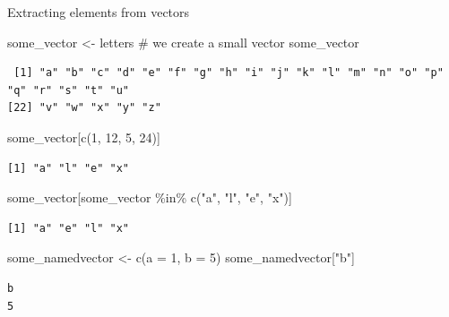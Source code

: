 \documentclass[
  ignorenonframetext,
  aspectratio=169,
]{beamer}
\newenvironment{Shaded}{\begin{snugshade}}{\end{snugshade}}
\newcommand{\AttributeTok}[1]{\textcolor[rgb]{0.40,0.45,0.13}{#1}}
\newcommand{\CommentTok}[1]{\textcolor[rgb]{0.37,0.37,0.37}{#1}}
\newcommand{\DecValTok}[1]{\textcolor[rgb]{0.68,0.00,0.00}{#1}}
\newcommand{\FunctionTok}[1]{\textcolor[rgb]{0.28,0.35,0.67}{#1}}
\newcommand{\NormalTok}[1]{\textcolor[rgb]{0.00,0.23,0.31}{#1}}
\newcommand{\OtherTok}[1]{\textcolor[rgb]{0.00,0.23,0.31}{#1}}
\newcommand{\SpecialCharTok}[1]{\textcolor[rgb]{0.37,0.37,0.37}{#1}}
\newcommand{\StringTok}[1]{\textcolor[rgb]{0.13,0.47,0.30}{#1}}
\begin{document}
\begin{frame}[fragile]{Extracting elements from vectors}
\protect{}\label{extracting-elements-from-vectors}
\footnotesize

\begin{Shaded}
\begin{Highlighting}[]
\NormalTok{some\_vector }\OtherTok{\textless{}{-}}\NormalTok{ letters }\CommentTok{\# we create a small vector}
\NormalTok{some\_vector}
\end{Highlighting}
\end{Shaded}

\begin{verbatim}
 [1] "a" "b" "c" "d" "e" "f" "g" "h" "i" "j" "k" "l" "m" "n" "o" "p" "q" "r" "s" "t" "u"
[22] "v" "w" "x" "y" "z"
\end{verbatim}

\begin{Shaded}
\begin{Highlighting}[]
\NormalTok{some\_vector[}\FunctionTok{c}\NormalTok{(}\DecValTok{1}\NormalTok{, }\DecValTok{12}\NormalTok{, }\DecValTok{5}\NormalTok{, }\DecValTok{24}\NormalTok{)]}
\end{Highlighting}
\end{Shaded}

\begin{verbatim}
[1] "a" "l" "e" "x"
\end{verbatim}

\begin{Shaded}
\begin{Highlighting}[]
\NormalTok{some\_vector[some\_vector }\SpecialCharTok{\%in\%} \FunctionTok{c}\NormalTok{(}\StringTok{"a"}\NormalTok{, }\StringTok{"l"}\NormalTok{, }\StringTok{"e"}\NormalTok{, }\StringTok{"x"}\NormalTok{)]}
\end{Highlighting}
\end{Shaded}

\begin{verbatim}
[1] "a" "e" "l" "x"
\end{verbatim}

\begin{Shaded}
\begin{Highlighting}[]
\NormalTok{some\_namedvector }\OtherTok{\textless{}{-}} \FunctionTok{c}\NormalTok{(}\AttributeTok{a =} \DecValTok{1}\NormalTok{, }\AttributeTok{b =} \DecValTok{5}\NormalTok{)}
\NormalTok{some\_namedvector[}\StringTok{"b"}\NormalTok{]}
\end{Highlighting}
\end{Shaded}

\begin{verbatim}
b 
5 
\end{verbatim}

\normalsize
\end{frame}
\end{document}
